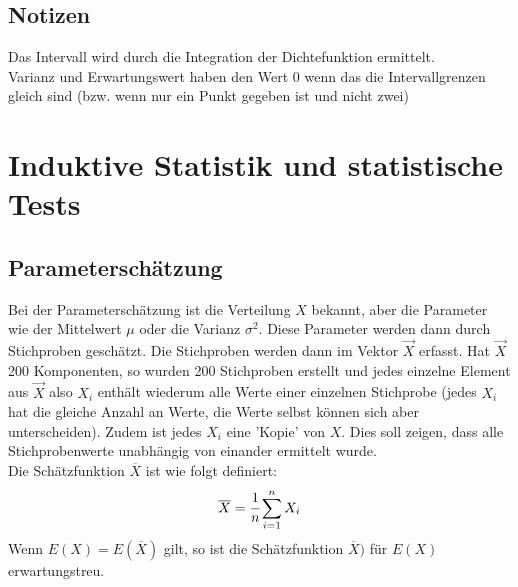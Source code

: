 \documentclass[a4paper]{scrartcl}
\begin{document}
            \subsection{Notizen}
                Das Intervall wird durch die Integration der Dichtefunktion ermittelt. \\
                Varianz und Erwartungswert haben den Wert 0 wenn das die Intervallgrenzen gleich sind (bzw. wenn nur ein Punkt gegeben ist und nicht zwei)
    \section{Induktive Statistik und statistische Tests}
        \subsection{Parameterschätzung}
            Bei der Parameterschätzung ist die Verteilung \(X\) bekannt, aber die Parameter wie der Mittelwert \(\mu\) oder die Varianz \(\sigma^2\).
            Diese Parameter werden dann durch Stichproben geschätzt. Die Stichproben werden dann im Vektor \(\vec{X}\) erfasst. Hat \(\vec{X}\)
            200 Komponenten, so wurden 200 Stichproben erstellt und jedes einzelne Element aus \(\vec{X}\) also \(X_i\) enthält wiederum alle Werte
            einer einzelnen Stichprobe (jedes \(X_i\) hat die gleiche Anzahl an Werte, die Werte selbst können sich aber unterscheiden). Zudem ist
            jedes \(X_i\) eine 'Kopie' von \(X\). Dies soll zeigen, dass alle Stichprobenwerte unabhängig von einander ermittelt wurde. \\
            Die Schätzfunktion \(\overline{X}\) ist wie folgt definiert: 
            \begin{equation*}
                \overline{X} = \cfrac{1}{n} \sum^n_{i=1} X_i
            \end{equation*}
            Wenn \(E(X) = E(\overline{X})\) gilt, so ist die Schätzfunktion \(\overline{X})\) für \(E(X)\) erwartungstreu.
\end{document}
